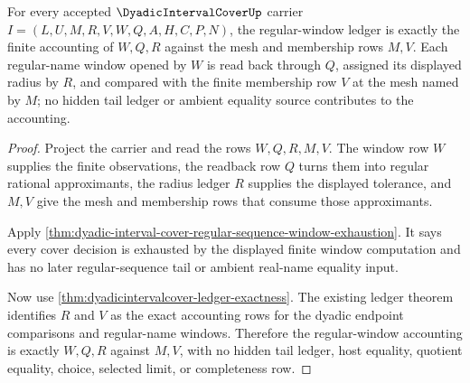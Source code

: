 \begin{theorem}
\label{thm:dyadic-interval-cover-regular-window-ledger}
For every accepted $\DyadicIntervalCoverUp$ carrier $I=(L,U,M,R,V,W,Q,A,H,C,P,N)$, the regular-window ledger is exactly the finite accounting of $W,Q,R$ against the mesh and membership rows $M,V$. Each regular-name window opened by $W$ is read back through $Q$, assigned its displayed radius by $R$, and compared with the finite membership row $V$ at the mesh named by $M$; no hidden tail ledger or ambient equality source contributes to the accounting.
\end{theorem}
\begin{proof}
Project the carrier and read the rows $W,Q,R,M,V$. The window row $W$ supplies the finite observations, the readback row $Q$ turns them into regular rational approximants, the radius ledger $R$ supplies the displayed tolerance, and $M,V$ give the mesh and membership rows that consume those approximants.

Apply \autoref{thm:dyadic-interval-cover-regular-sequence-window-exhaustion}. It says every cover decision is exhausted by the displayed finite window computation and has no later regular-sequence tail or ambient real-name equality input.

Now use \autoref{thm:dyadicintervalcover-ledger-exactness}. The existing ledger theorem identifies $R$ and $V$ as the exact accounting rows for the dyadic endpoint comparisons and regular-name windows. Therefore the regular-window accounting is exactly $W,Q,R$ against $M,V$, with no hidden tail ledger, host equality, quotient equality, choice, selected limit, or completeness row.
\end{proof}

